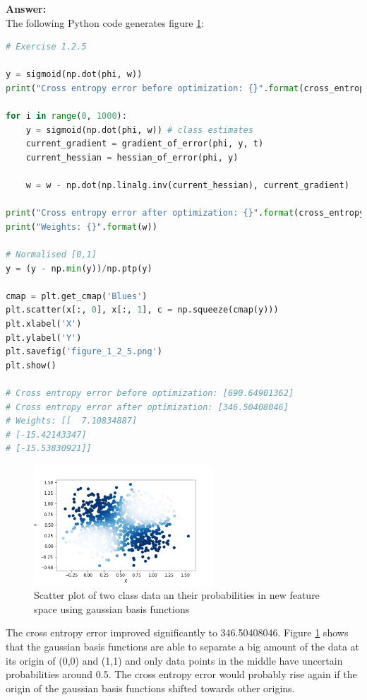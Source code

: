 \documentclass[a4paper]{article}
\begin{document}
\textbf{Answer:}\\

The following Python code generates figure \ref{Fig:1_2_5}:

\begin{lstlisting}[language=Python]
# Exercise 1.2.5

y = sigmoid(np.dot(phi, w))
print("Cross entropy error before optimization: {}".format(cross_entropy_error(y, t)))

for i in range(0, 1000):
    y = sigmoid(np.dot(phi, w)) # class estimates
    current_gradient = gradient_of_error(phi, y, t)
    current_hessian = hessian_of_error(phi, y)
    
    w = w - np.dot(np.linalg.inv(current_hessian), current_gradient)
    
print("Cross entropy error after optimization: {}".format(cross_entropy_error(y, t)))
print("Weights: {}".format(w))

# Normalised [0,1]
y = (y - np.min(y))/np.ptp(y)

cmap = plt.get_cmap('Blues')
plt.scatter(x[:, 0], x[:, 1], c = np.squeeze(cmap(y)))
plt.xlabel('X')
plt.ylabel('Y')
plt.savefig('figure_1_2_5.png')
plt.show()

# Cross entropy error before optimization: [690.64901362]
# Cross entropy error after optimization: [346.50408046]
# Weights: [[  7.10834887]
# [-15.42143347]
# [-15.53830921]]
\end{lstlisting}


\begin{figure}[H]
\center
\includegraphics[width=0.6\textwidth]{Images/figure_1_2_5.png}
\caption{Scatter plot of two class data an their probabilities in new feature space using gaussian basis functions}
\label{Fig:1_2_5}
\end{figure}

The cross entropy error improved significantly to 346.50408046. Figure \ref{Fig:1_2_5} shows that the gaussian basis functions are able to separate a big amount of the data at its origin of (0,0) and (1,1) and only data points in the middle have uncertain probabilities around 0.5. The cross entropy error would probably rise again if the origin of the gaussian basis functions shifted towards other origins.
\end{document}
